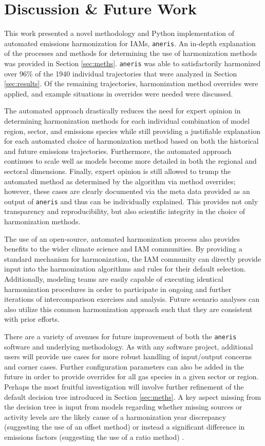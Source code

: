 \documentclass[review]{elsarticle}
\newcommand{\code}[1]{\lstinline[basicstyle=\ttfamily\color{black}]|#1|}
\begin{document}
\section{Discussion \& Future Work}\label{sec:future}

This work presented a novel methodology and Python implementation of automated
emissions harmonization for IAMs, \code{aneris}. An in-depth explanation of the
processes and methods for determining the use of harmonization methods was
provided in Section \ref{sec:meths}. \code{aneris} was able to satisfactorily
harmonized over 96\% of the 1940 individual trajectories that were analyzed in
Section \ref{sec:results}. Of the remaining trajectories, harmonization method
overrides were applied, and example situations in overrides were needed were
discussed.

The automated approach drastically reduces the need for expert opinion in
determining harmonization methods for each individual combination of model
region, sector, and emissions species while still providing a justifiable
explanation for each automated choice of harmonization method based on both the
historical and future emissions trajectories. Furthermore, the automated
approach continues to scale well as models become more detailed in both the
regional and sectoral dimensions. Finally, expert opinion is still allowed to
trump the automated method as determined by the algorithm via method overrides;
however, these cases are clearly documented via the meta data provided as an
output of \code{aneris} and thus can be individually explained. This provides
not only transparency and reproducibility, but also scientific integrity in the
choice of harmonization methods.

The use of an open-source, automated harmonization process also provides
benefits to the wider climate science and IAM communities. By providing a
standard mechanism for harmonization, the IAM community can directly provide
input into the harmonization algorithms and rules for their default
selection. Additionally, modeling teams are easily capable of executing
identical harmonization procedures in order to participate in ongoing and
further iterations of intercomparison exercises and analysis. Future scenario
analyses can also utilize this common harmonization approach such that they are
consistent with prior efforts.

There are a variety of avenues for future improvement of both the \code{aneris}
software and underlying methodology. As with any software project, additional
users will provide use cases for more robust handling of input/output concerns
and corner cases. Further configuration parameters can also be added in the
future in order to provide overrides for all gas species in a given sector or
region. Perhaps the most fruitful investigation will involve further refinement
of the default decision tree introduced in Section \ref{sec:meths}. A key aspect
missing from the decision tree is input from models regarding whether missing
sources or activity levels are the likely cause of a harmonization year
discrepancy (suggesting the use of an offset method) or instead a significant
difference in emissions factors (suggesting the use of a ratio method)
\cite{rogelj_discrepancies_2011}.
\end{document}
